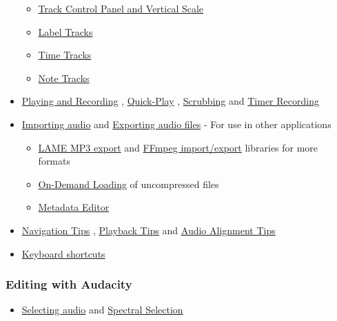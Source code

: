 \begin{multicols}{2}
\begin{itemize}
\begin{itemize}
\item 
\hyperref[\foo{man:track:control:panel:and:vertical:scale:}]{Track Control Panel and Vertical Scale}

\item 
\hyperref[\foo{man:label:tracks:}]{Label Tracks}

\item 
\hyperref[\foo{man:time:tracks:}]{Time Tracks}

\item 
\hyperref[\foo{man:note:tracks:}]{Note Tracks}

\end{itemize}

\item 
\hyperref[\foo{man:playing:and:recording:}]{Playing and Recording}
, 
\hyperref[\foo{man:timeline:tqp}]{Quick-Play}
, 
\hyperref[\foo{man:scrubbing:and:seeking:}]{Scrubbing}
 and 
\hyperref[\foo{man:timer:record:}]{Timer Recording}

\item 
\hyperref[\foo{man:importing:audio:}]{Importing audio}
 and 
\hyperref[\foo{man:exporting:audio:}]{Exporting audio files}
 - For use in other applications

\begin{itemize}
\item 
\hyperref[\foo{man:faq:installation:and:plug:ins:lame}]{LAME MP3 export}
 and 
\hyperref[\foo{man:faq:installation:and:plug:ins:ffdown}]{FFmpeg import/export}
 libraries for more formats
\item 
\hyperref[\foo{man:on:demand:loading:}]{On-Demand Loading}
 of uncompressed files
\item 
\hyperref[\foo{man:metadata:editor:}]{Metadata Editor}

\end{itemize}

\item 
\hyperref[\foo{man:navigation:tips:}]{Navigation Tips}
, 
\hyperref[\foo{man:playback:tips:}]{Playback Tips}
 and 
\hyperref[\foo{man:audio:alignment:tips:}]{Audio Alignment Tips}

\item 
\hyperref[\foo{man:keyboard:shortcut:reference:}]{Keyboard shortcuts}

\end{itemize}

\subsubsection{Editing with Audacity}
\begin{itemize}
\item 
\hyperref[\foo{man:audacity:selection:}]{Selecting audio}
 and 
\hyperref[\foo{man:spectral:selection:}]{Spectral Selection}


\end{itemize}
\end{multicols}
